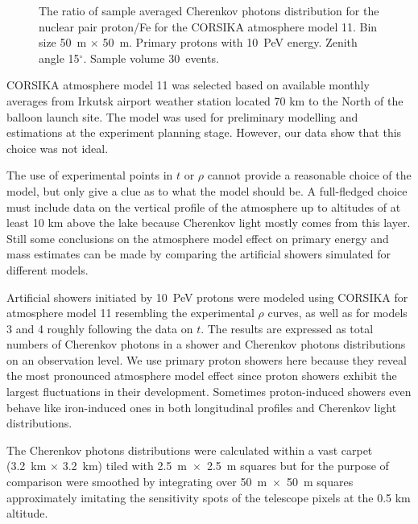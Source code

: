 \documentclass[universe,article,submit,moreauthors,pdftex]{Definitions/mdpi}
\begin{document}
\begin{figure}[tb]
\begin{minipage}[t]{0.48\textwidth}
        \vspace{-1.0pc}
        \caption{The ratio of sample averaged Cherenkov photons distribution for the nuclear pair proton/Fe for the CORSIKA atmosphere model 11. Bin size 50~m $\times$ 50~m. Primary protons with 10~PeV energy. Zenith angle 15$^\circ$. Sample volume 30~events.}
        \label{fig:pdFe}
    \end{minipage}
\end{figure}


CORSIKA atmosphere model 11 was selected based on available monthly averages from Irkutsk airport weather station located 70 km to the North of the balloon launch site. The model was used for preliminary modelling and estimations at the experiment planning stage. However, our data show that this choice was not ideal.

The use of experimental points in $t$ or $\rho$ cannot provide a reasonable choice of the model, but only give a clue as to what the model should be. A full-fledged choice must include data on the vertical profile of the atmosphere up to altitudes of at least 10 km above the lake because Cherenkov light mostly comes from this layer. Still some conclusions on the atmosphere model effect on primary energy and mass estimates can be made by comparing the artificial showers simulated for different models.

Artificial showers initiated by 10~PeV protons were modeled using CORSIKA for atmosphere model 11 resembling the experimental $\rho$ curves, as well as for models 3 and 4 roughly following the data on $t$. The results are expressed as total numbers of Cherenkov photons in a shower and Cherenkov photons distributions on an observation level. We use primary proton showers here because they reveal the most pronounced atmosphere model effect since proton showers exhibit the largest fluctuations in their development. Sometimes proton-induced showers even behave like iron-induced ones in both longitudinal profiles and  Cherenkov light distributions. 

The Cherenkov photons distributions were calculated within a vast carpet (3.2~km $\times$ 3.2~km) tiled with 2.5~m~$\times$~2.5~m squares but for the purpose of comparison were smoothed by integrating over 50~m~$\times$~50~m squares approximately imitating the sensitivity spots of the telescope pixels at the 0.5 km altitude.
\end{document}
